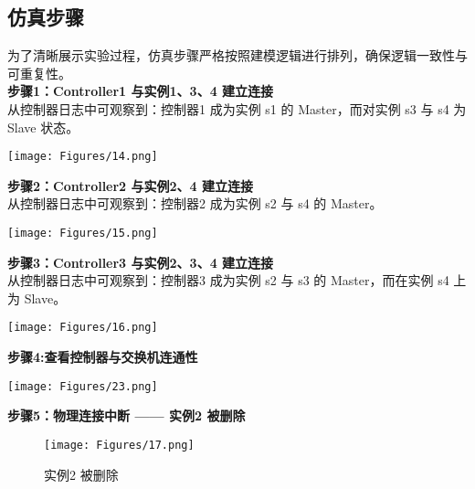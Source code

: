 \documentclass{article}
\begin{document}
\subsection{\textbf{仿真步骤}}
为了清晰展示实验过程，仿真步骤严格按照建模逻辑进行排列，确保逻辑一致性与可重复性。\\
\noindent \textbf{步骤1：Controller1 与实例1、3、4 建立连接}\\
\noindent 从控制器日志中可观察到：控制器1 成为实例 s1 的 Master，而对实例 s3 与 s4 为 Slave 状态。
\begin{center}
    \texttt{[image: Figures/14.png]}
    \captionsetup{type=figure}
\end{center}


\noindent \textbf{步骤2：Controller2 与实例2、4 建立连接}\\
\noindent 从控制器日志中可观察到：控制器2 成为实例 s2 与 s4 的 Master。
\begin{center}
    \texttt{[image: Figures/15.png]}
    \captionsetup{type=figure}
\end{center}



\noindent \textbf{步骤3：Controller3 与实例2、3、4 建立连接}\\
\noindent 从控制器日志中可观察到：控制器3 成为实例 s2 与 s3 的 Master，而在实例 s4 上为 Slave。
\begin{center}
    \texttt{[image: Figures/16.png]}
    \captionsetup{type=figure}
\end{center}


\noindent \textbf{步骤4:查看控制器与交换机连通性}

\begin{center}
    \texttt{[image: Figures/23.png]}
    \captionsetup{type=figure}
\end{center}



\noindent \textbf{步骤5：物理连接中断 —— 实例2 被删除}\\

\begin{figure}[h]
\centering
\texttt{[image: Figures/17.png]}
\caption{实例2 被删除}
\end{figure}
\end{document}
